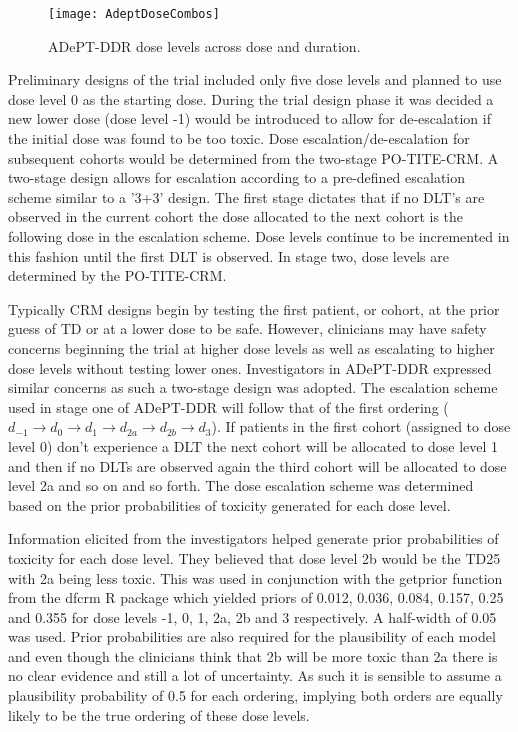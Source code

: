 \begin{figure}[h!]
	\centering
	\caption{ADePT-DDR dose levels across dose and duration.}
	\label{fig_adept:AZD_dose_levels}
	\texttt{[image: AdeptDoseCombos]}
\end{figure}

Preliminary designs of the trial included only five dose levels and planned to use dose level 0 as the starting dose. During the trial design phase it was decided a new lower dose (dose level -1) would be introduced to allow for de-escalation if the initial dose was found to be too toxic. Dose escalation/de-escalation for subsequent cohorts would be determined from the two-stage PO-TITE-CRM. A two-stage design allows for escalation according to a pre-defined escalation scheme similar to a '3+3' design. The first stage dictates that if no DLT's are observed in the current cohort the dose allocated to the next cohort is the following dose in the escalation scheme. Dose levels continue to be incremented in this fashion until the first DLT is observed. In stage two, dose levels are determined by the PO-TITE-CRM.

Typically CRM designs begin by testing the first patient, or cohort, at the prior guess of TD or at a lower dose to be safe. However, clinicians may have safety concerns beginning the trial at higher dose levels as well as escalating to higher dose levels without testing lower ones. Investigators in ADePT-DDR expressed similar concerns as such a two-stage design was adopted. The escalation scheme used in stage one of ADePT-DDR will follow that of the first ordering ($d_{-1} \rightarrow d_{0} \rightarrow d_{1} \rightarrow d_{2a} \rightarrow d_{2b} \rightarrow d_{3}$). If patients in the first cohort (assigned to dose level 0) don't experience a DLT the next cohort will be allocated to dose level 1 and then if no DLTs are observed again the third cohort will be allocated to dose level 2a and so on and so forth. The dose escalation scheme was determined based on the prior probabilities of toxicity generated for each dose level.  

Information elicited from the investigators helped generate prior probabilities of toxicity for each dose level. They believed that dose level 2b would be the TD25 with 2a being less toxic. This was used in conjunction with the getprior function from the dfcrm R package \cite{cheungDfcrmDoseFindingContinual2019} which yielded priors of 0.012, 0.036, 0.084, 0.157, 0.25 and 0.355 for dose levels -1, 0, 1, 2a, 2b and 3 respectively. A half-width of 0.05 was used. Prior probabilities are also required for the plausibility of each model and even though the clinicians think that 2b will be more toxic than 2a there is no clear evidence and still a lot of uncertainty. As such it is sensible to assume a plausibility probability of 0.5 for each ordering, implying both orders are equally likely to be the true ordering of these dose levels. 

